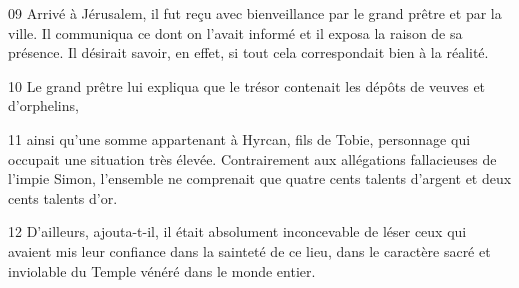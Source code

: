 
09 Arrivé à Jérusalem, il fut reçu avec bienveillance par le grand prêtre et par la ville. Il communiqua ce dont on l’avait informé et il exposa la raison de sa présence. Il désirait savoir, en effet, si tout cela correspondait bien à la réalité.

10 Le grand prêtre lui expliqua que le trésor contenait les dépôts de veuves et d’orphelins,

11 ainsi qu’une somme appartenant à Hyrcan, fils de Tobie, personnage qui occupait une situation très élevée. Contrairement aux allégations fallacieuses de l’impie Simon, l’ensemble ne comprenait que quatre cents talents d’argent et deux cents talents d’or.

12 D’ailleurs, ajouta-t-il, il était absolument inconcevable de léser ceux qui avaient mis leur confiance dans la sainteté de ce lieu, dans le caractère sacré et inviolable du Temple vénéré dans le monde entier.
